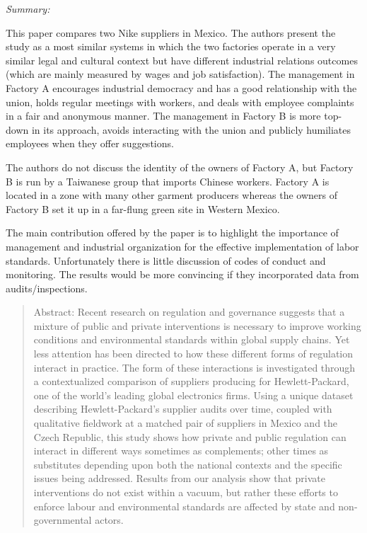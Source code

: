 \documentclass[
  12pt,
]{article}
\begin{document}
\emph{Summary:}

This paper compares two Nike suppliers in Mexico. The authors present
the study as a most similar systems in which the two factories operate
in a very similar legal and cultural context but have different
industrial relations outcomes (which are mainly measured by wages and
job satisfaction). The management in Factory A encourages industrial
democracy and has a good relationship with the union, holds regular
meetings with workers, and deals with employee complaints in a fair and
anonymous manner. The management in Factory B is more top-down in its
approach, avoids interacting with the union and publicly humiliates
employees when they offer suggestions.

The authors do not discuss the identity of the owners of Factory A, but
Factory B is run by a Taiwanese group that imports Chinese workers.
Factory A is located in a zone with many other garment producers whereas
the owners of Factory B set it up in a far-flung green site in Western
Mexico.

The main contribution offered by the paper is to highlight the
importance of management and industrial organization for the effective
implementation of labor standards. Unfortunately there is little
discussion of codes of conduct and monitoring. The results would be more
convincing if they incorporated data from audits/inspections.

\bigbreak


\begin{quote}
Abstract: 
Recent research on regulation and governance suggests that a mixture of public and private interventions is necessary to improve working conditions and environmental standards within global supply chains. Yet less attention has been directed to how these different forms of regulation interact in practice. The form of these interactions is investigated through a contextualized comparison of suppliers producing for Hewlett-Packard, one of the world's leading global electronics firms. Using a unique dataset describing Hewlett-Packard's supplier audits over time, coupled with qualitative fieldwork at a matched pair of suppliers in Mexico and the Czech Republic, this study shows how private and public regulation can interact in different ways \textemdash{} sometimes as complements; other times as substitutes \textemdash{} depending upon both the national contexts and the specific issues being addressed. Results from our analysis show that private interventions do not exist within a vacuum, but rather these efforts to enforce labour and environmental standards are affected by state and non-governmental actors.
\end{quote}
\end{document}

